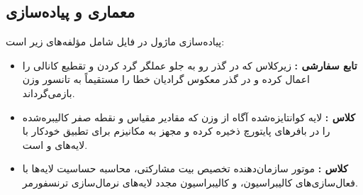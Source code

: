 \subsection{معماری و پیاده‌سازی}
پیاده‌سازی ماژول در فایل  شامل مؤلفه‌های زیر است:
\begin{itemize}
    \item \textbf{تابع سفارشی :} زیرکلاس  که در گذر رو به جلو عملگر گرد کردن و تقطیع کانالی را اعمال کرده و در گذر معکوس گرادیان خطا را مستقیماً به تانسور وزن بازمی‌گرداند.
    \item \textbf{کلاس :} لایه کوانتایزه‌شده آگاه از وزن که مقادیر مقیاس و نقطه صفر کالیبره‌شده را در بافرهای پایتورچ ذخیره کرده و مجهز به مکانیزم  برای تطبیق خودکار با لایه‌های  و  است.
    \item \textbf{کلاس :} موتور سازمان‌دهنده تخصیص بیت مشارکتی، محاسبه حساسیت لایه‌ها با فعال‌سازی‌های کالیبراسیون، و کالیبراسیون مجدد لایه‌های نرمال‌سازی ترنسفورمر.
\end{itemize}
